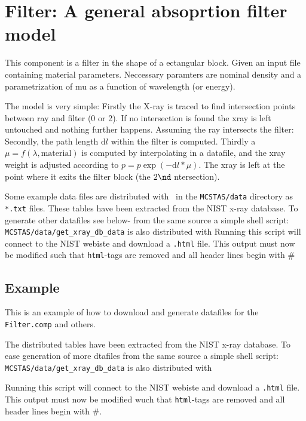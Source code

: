 \section{Filter: A general absoprtion filter model}
\label{filter}


This component is a filter in the shape of a ectangular block. Given an input file containing material parameters.
Neccessary paramters are nominal density and a parametrization of mu as a function of wavelength (or energy).

The model is very simple: Firstly the X-ray is traced to find intersection points between ray and filter (0 or 2).
If no intersection is found the xray is left untouched and nothing further happens.
Assuming the ray intersects the filter: Secondly, the path length d$l$ within the filter is computed.
Thirdly a $\mu = f(\lambda,\mathrm{material})$ is computed by interpolating in a datafile, and the xray weight is adjusted according to $p=p\exp(-\mathrm{d}l*\mu)$. The xray is left at the point where it exits the filter block (the $2\nd$ ntersection).

Some example data files are distributed with \MCX\ in the
\verb+MCSTAS/data+ directory as \verb+*.txt+ files. These tables have been extracted from the NIST x-ray database.
To generate other datafiles see below-
from the same source a simple shell script: \verb+MCSTAS/data/get_xray_db_data+ is also distributed with \MCX
Running this script will connect to the NIST webiste and download a
\verb+.html+ file. This output must now be modified such that \verb+html+-tags
are removed and all header lines begin with $\#$

\subsection{Example}
\label{getNISTdata}
This is an example of how to download and generate datafiles for the \verb+Filter.comp+ and others.

The distributed tables have been extracted from the NIST x-ray database. To ease generation of more dtafiles
from the same source a simple shell script: \verb+MCSTAS/data/get_xray_db_data+ is also distributed with \MCX

Running this script will connect to the NIST webiste and download a \verb+.html+ file. This output must now be modified wuch that \verb+html+-tags
are removed and all header lines begin with $\#$.

